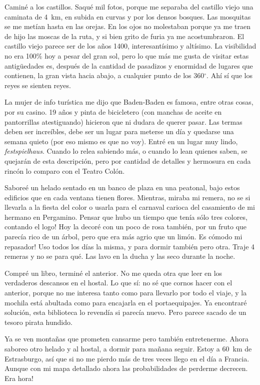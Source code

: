 Camin\'e a los castillos. Saqu\'e mil fotos, porque me separaba del castillo
viejo una caminata de 4~km, en subida en curvas y por los densos bosques. Las
mosquitas se me met\'ian hasta en las orejas. En los ojos no molestaban porque
ya me traen de hijo las moscas de la ruta, y si bien grito de furia ya me
acostumbraron. El castillo viejo parece ser de los a\~nos 1400,
interesant\'isimo y alt\'isimo. La visibilidad no era 100\% hoy a pesar del
gran sol, pero lo que m\'as me gusta de visitar estas antig\"uedades es,
despu\'es de la cantidad de pasadizos y enormidad de lugares que contienen, la
gran vista hacia abajo, a cualquier punto de los 360$^{\circ}$. Ah\'i s\'i que
los reyes se sienten reyes.

La mujer de info tur\'istica me dijo que Baden-Baden es famosa, entre otras
cosas, por su casino. 19 a\~nos y pinta de bicicletero (con manchas de aceite
en pantorrillas atestiguando) hicieron que ni dudara de querer pasar. Las
termas deben ser incre\'ibles, debe ser un lugar para meterse un d\'ia y
quedarse una semana quieto (por eso mismo es que no voy). Entr\'e en un
lugar muy lindo, \emph{festspielhaus}. Cuando lo relea sabiendo m\'as, o
cuando lo lean quienes saben, se quejar\'an de esta descripci\'on, pero por
cantidad de detalles y hermosura en cada rinc\'on lo comparo con el Teatro
Col\'on.

Sabore\'e un helado sentado en un banco de plaza en una peatonal, bajo estos
edificios que en cada ventana tienen flores. Mientras, miraba mi
remera, no se si llevarla a la fiesta del color o usarla para
el carnaval carioca del casamiento de mi hermano en Pergamino. \textexclamdown
Pensar que hubo un tiempo que ten\'ia s\'olo tres colores, contando el logo!
Hoy la decor\'e con un poco de rosa tambi\'en, por un fruto que parec\'ia rico
de un \'arbol, pero que era m\'as agrio que un lim\'on. \textexclamdown Es
c\'omodo mi repasador! Uso todos los d\'ias la misma, y para dormir tambi\'en
pero otra. Traje 4 remeras y no se para qu\'e. Las lavo en la ducha y las seco
durante la noche.

Compr\'e un libro, termin\'e el anterior. No me queda otra que leer en los
verdaderos descansos en el hostal. Lo que s\'i: no s\'e que cornos hacer con
el anterior, porque no me interesa tanto como para llevarlo por todo el viaje,
y la mochila est\'a abultada como para encajarla en el portaequipajes. Ya
encontrar\'e soluci\'on, esta biblioteca lo revend\'ia si parec\'ia nuevo.
Pero parece sacado de un tesoro pirata hundido.

Ya se ven monta\~nas que prometen cansarme pero tambi\'en entretenerme. Ahora
saboreo otro helado y al hostal, a dormir para ma\~nana seguir. Estoy a 60~km
de Estrasburgo, as\'i que si no me pierdo m\'as de tres veces llego en el
d\'ia a Francia. Aunque con mi mapa detallado ahora las probabilidades de
perderme decrecen. \textexclamdown Era hora!

